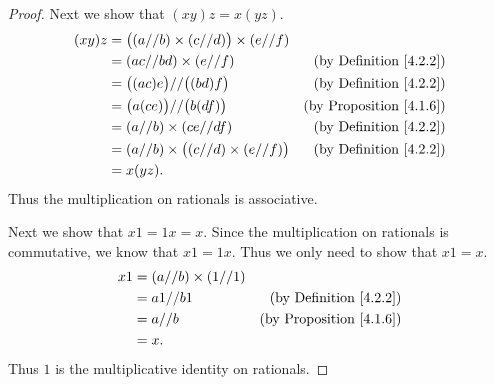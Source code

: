 \begin{proof}
    Next we show that \((xy)z = x(yz)\).
    \begin{align*}
        (xy)z & = \big((a // b) \times (c // d)\big) \times (e // f)                                       \\
              & = (ac // bd) \times (e // f)                         & \text{(by Definition \ref{4.2.2})}  \\
              & = \big((ac)e\big) // \big((bd)f\big)                 & \text{(by Definition \ref{4.2.2})}  \\
              & = \big(a(ce)\big) // \big(b(df)\big)                 & \text{(by Proposition \ref{4.1.6})} \\
              & = (a // b) \times (ce // df)                         & \text{(by Definition \ref{4.2.2})}  \\
              & = (a // b) \times \big((c // d) \times (e // f)\big) & \text{(by Definition \ref{4.2.2})}  \\
              & = x(yz).
    \end{align*}
    Thus the multiplication on rationals is associative.

    Next we show that \(x1 = 1x = x\).
    Since the multiplication on rationals is commutative, we know that \(x1 = 1x\).
    Thus we only need to show that \(x1 = x\).
    \begin{align*}
        x1 & = (a // b) \times (1 // 1)                                       \\
           & = a1 // b1                 & \text{(by Definition \ref{4.2.2})}  \\
           & = a // b                   & \text{(by Proposition \ref{4.1.6})} \\
           & = x.
    \end{align*}
    Thus \(1\) is the multiplicative identity on rationals.


\end{proof}
